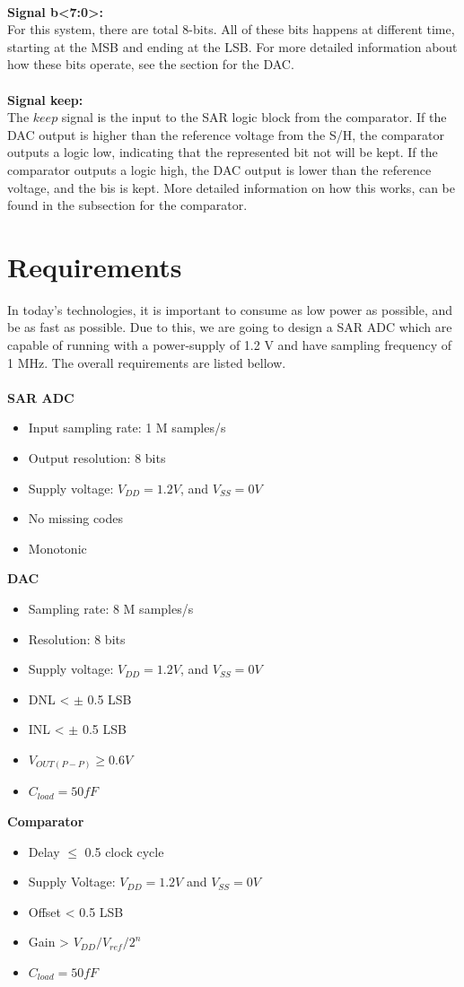 \documentclass[english, 12pt, a4paper]{ifimaster}
\begin{document}
\\
\textbf{Signal b<7:0>:}\\
For this system, there are total 8-bits. All of these bits happens at different time, starting at the MSB and ending at the LSB. For more detailed information about how these bits operate, see
the section for the DAC.\\
\\
\textbf{Signal keep:}\\
The \(keep\) signal is the input to the SAR logic block from the comparator. If the DAC output is higher than the reference voltage from the S/H, the comparator outputs a logic low, indicating
that the represented bit not will be kept. If the comparator outputs a logic high, the DAC output is lower than the reference voltage, and the bis is kept. More detailed information on how this works, 
can be found in the subsection for the comparator.  



\section{Requirements}
In today's technologies, it is important to consume as low power as possible, and be as fast as possible. Due to this, we are going to design a SAR ADC which are capable 
of running with a power-supply of 1.2 V and have sampling frequency of 1 MHz. The overall requirements are listed bellow.\\
\\
\textbf{SAR ADC}
\begin{itemize}
 \item Input sampling rate: 1 M samples/s
 \item Output resolution: 8 bits
 \item Supply voltage: \(V_{DD} = 1.2 V\), and \(V_{SS} = 0 V\)
 \item No missing codes
 \item Monotonic
\end{itemize}
\textbf{DAC}
\begin{itemize}
 \item Sampling rate: 8 M samples/s
 \item Resolution: 8 bits
 \item Supply voltage: \(V_{DD} = 1.2 V\), and \(V_{SS} = 0 V\)
 \item DNL < \(\pm\) 0.5 LSB
 \item INL < \(\pm\) 0.5 LSB
 \item \(V_{OUT(P-P)} \geq 0.6 V\)
 \item \(C_{load} = 50 fF\)
\end{itemize}
\textbf{Comparator}
\begin{itemize}
 \item Delay \(\leq\) 0.5 clock cycle
 \item Supply Voltage: \(V_{DD} = 1.2V\) and \(V_{SS} = 0V\) 
 \item Offset < 0.5 LSB
 \item Gain > \(V_{DD}/V_{ref}/2^{n}\)
 \item \(C_{load} = 50 fF\)
\end{itemize}
\end{document}
